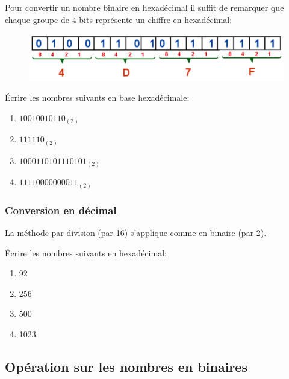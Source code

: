 \documentclass[11pt, a4paper]{book}
\begin{document}
Pour convertir un nombre binaire en hexadécimal il suffit de remarquer que chaque groupe de 4 bits représente un chiffre en hexadécimal:

\begin{figure}[h]
\begin{center}
\includegraphics[scale=.5]{images/hexadecimal}
\end{center}
\end{figure}

\begin{exercice}
Écrire les nombres suivants en base hexadécimale:
\begin{multicols}{2}
\begin{enumerate}
\item $10010010110_{(2)}$
\item $111110_{(2)}$
\item  $1000110101110101_{(2)}$
\item $11110000000011_{(2)}$
\end{enumerate}
\end{multicols}
\end{exercice}

\subsubsection{Conversion en décimal}

La méthode par division (par 16) s'applique comme en binaire (par 2).

\begin{exercice}
Écrire les nombres suivants en hexadécimal:
\begin{multicols}{2}
\begin{enumerate}
\item 92
\item 256
\item  500
\item 1023
\end{enumerate}
\end{multicols}
\end{exercice}



\subsection{Opération sur les nombres en binaires}
\end{document}
